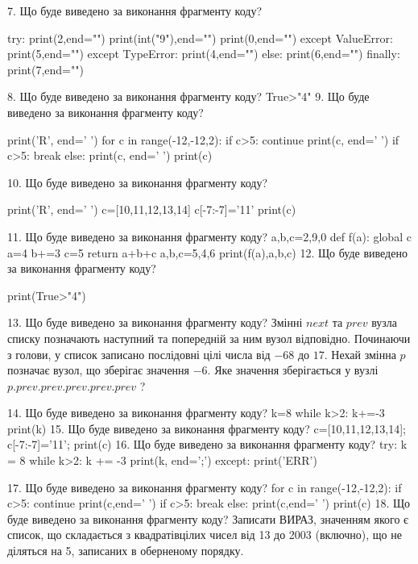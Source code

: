 \documentclass[11pt]{article}
\begin{document}
7. Що буде виведено за виконання фрагменту коду?

try:
    print(2,end="")
    print(int("9"),end="")
    print(0,end="")
except ValueError: print(5,end="")
except TypeError: print(4,end="")
else: print(6,end="")
finally: print(7,end="")


8. Що буде виведено за виконання фрагменту коду?
True>"4"
9. Що буде виведено за виконання фрагменту коду?

print('R', end=' ')
for c in range(-12,-12,2):
    if c>5:
        continue
        print(c, end=' ')
    if c>5:
        break
    else:
        print(c, end=' ')
    print(c)

10. Що буде виведено за виконання фрагменту коду?

print('R', end=' ')
c=[10,11,12,13,14]
c[-7:-7]='11'
print(c)


11. Що буде виведено за виконання фрагменту коду?
a,b,c=2,9,0
   def f(a):
     global c     a=4
     b+=3
     c=5
     return a+b+c
   a,b,c=5,4,6
   print(f(a),a,b,c)
12. Що буде виведено за виконання фрагменту коду?

print(True>"4")

13. Що буде виведено за виконання фрагменту коду?
Змінні $next$ та $prev$ вузла списку позначають наступний та попередній за ним вузол відповідно. Починаючи з голови, у список записано послідовні цілі числа від $-68$ до $17$. Нехай змінна $p$ позначає вузол, що зберігає значення $-6$.
Яке значення зберігається у вузлі $p.prev.prev.prev.prev.prev$ ?

14. Що буде виведено за виконання фрагменту коду?
k=8
   while k>2: k+=-3
   print(k)
15. Що буде виведено за виконання фрагменту коду?
c=[10,11,12,13,14]; c[-7:-7]='11'; print(c)
16. Що буде виведено за виконання фрагменту коду?
try:
    k = 8
    while k>2:
        k += -3
    print(k, end=';')
except:
    print('ERR')

17. Що буде виведено за виконання фрагменту коду?
for c in range(-12,-12,2):
     if c>5: continue
     print(c,end=' ')
     if c>5: break
   else: print(c,end=' ')
   print(c)
18. Що буде виведено за виконання фрагменту коду?
Записати ВИРАЗ, значенням якого є список, що складається з квадратівцілих чисел від 13 до 2003 (включно), що не діляться на 5, записаних в обернено\-му порядку.
\end{document}
